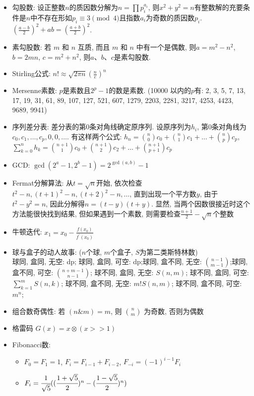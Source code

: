 \documentclass[landscape,a4paper]{article}
\begin{document}
\begin{spacing}{0.3}
\begin{multicols}{2}
\begin{itemize}
\item 勾股数: 设正整数$n$的质因数分解为$n = \prod p_i ^ {a_i}$,
  则$x^2+y^2=n$有整数解的充要条件是$n$中不存在形如$p_i \equiv 3\pmod{4}$且指数$a_i$为奇数的质因数$p_i$.
  $(\frac{a - b}{2})^2 + ab = (\frac{a + b}{2})^2$.
\item 素勾股数: 若 $m$ 和 $n$ 互质, 而且 $m$ 和 $n$ 中有一个是偶数, 则$a = m^2 - n^2$, $b = 2mn$, $c = m^2 + n^2$, 则$a$、$b$、$c$是素勾股数.
\item Stirling公式: $n! \approx \sqrt{2 \pi n} (\frac{n}{e})^n$
\item Mersenne素数: $p$是素数且$2^p-1$的数是素数. (10000 以内的$p$有: 2, 3, 5, 7, 13, 17, 19, 31, 61, 89, 107, 127, 521, 607, 1279, 2203, 2281, 3217, 4253, 4423, 9689, 9941)
\item 序列差分表: 差分表的第$0$条对角线确定原序列.
  设原序列为$h_i$, 第$0$条对角线为$c_0,c_1,\ldots,c_p,0,0,\ldots$.
  有这样两个公式:
  $h_n = \binom{n}{0}c_0 + \binom{n}{1}c_1 + \ldots + \binom{n}{p} c_p$,
  $\sum_{k = 0}^{n}h_k = \binom{n+1}{1}c_0 + \binom{n+1}{2}c_2 + \ldots + \binom{n+1}{p+1}c_p$
\item GCD:
  $\gcd(2^a-1,2^b-1)=2^{\gcd(a,b)}-1$
\item Fermat分解算法:
  从$t=\sqrt{n}$开始,
  依次检查$t^2-n,(t+1)^2-n,(t+2)^2-n,\ldots$,
  直到出现一个平方数$y$,
  由于$t ^ 2 - y ^ 2 = n$,
  因此分解得$n = (t -y)(t + y)$.
  显然, 当两个因数很接近时这个方法能很快找到结果,
  但如果遇到一个素数, 则需要检查$\frac{n + 1}{2} - \sqrt{n}$个整数
\item 牛顿迭代:
  $x_1 = x_0 - \frac{f(x_0)}{f^\prime(x_0)}$
\item 球与盒子的动人故事: ($n$个球, $m$个盒子, $S$为第二类斯特林数)\\
 球同, 盒同, 无空: dp; 球同, 盒同, 可空: dp;球同, 盒不同, 无空: $\binom{n - 1}{m - 1}$;球同, 盒不同, 可空: $\binom{n + m - 1}{n - 1}$;
      球不同, 盒同, 无空: $S(n, m)$;
      球不同, 盒同, 可空: $\sum_{k = 1}^{m} S(n, k)$;
      球不同, 盒不同, 无空: $m! S(n, m)$;
      球不同, 盒不同, 可空: $m^n$;
\item 组合数奇偶性: 若 $(n \& m) = m$, 则 $\binom{n}{m}$ 为奇数, 否则为偶数
\item 格雷码 $G(x) = x \otimes (x >> 1) $
\item Fibonacci数:
  \begin{itemize}
  \item $F_0 = F_1 = 1$, $F_i = F_{i - 1} + F_{i - 2}$, $F_{-i} = (-1) ^ {i - 1} F_i$
  \item $F_i = \cfrac{1}{\sqrt{5}} ((\cfrac{1 + \sqrt{5}}{2}) ^ n - (\cfrac{1 - \sqrt{5}}{2}) ^ {n}) $

\end{itemize}
\end{itemize}
\end{multicols}
\end{spacing}
\end{document}

